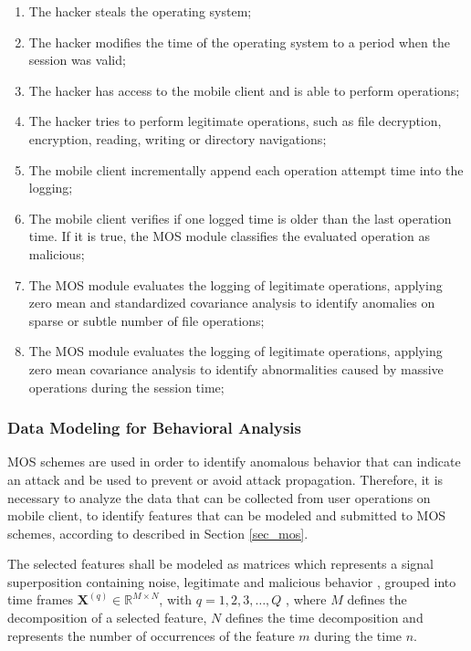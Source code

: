 \documentclass[twocolumn]{svjour3}          	%
\begin{document}
\begin{enumerate}[label=(\alph*)]
	\item The hacker steals the operating system;
	\item The hacker modifies the time of the operating system to a period when the session was valid;
	\item The hacker has access to the mobile client and is able to perform operations;
	\item The hacker tries to perform legitimate operations, such as file decryption, encryption, reading, writing or directory navigations;
	\item The mobile client incrementally append each operation attempt time into the logging;
	\item The mobile client verifies if one logged time is older than the last operation time. If it is true, the MOS module classifies the evaluated operation as malicious;
	\item The MOS module evaluates the logging of legitimate operations, applying zero mean and standardized covariance analysis to identify anomalies on sparse or subtle number of file operations;
	\item The MOS module evaluates the logging of legitimate operations, applying zero mean covariance analysis to identify abnormalities caused by massive operations during the session time;
\end{enumerate}

\subsubsection{Data Modeling for Behavioral Analysis }
\label{sec_data}

MOS schemes are used in order to identify anomalous behavior that can indicate an attack and be used to prevent or avoid attack propagation. Therefore, it is necessary to analyze the data that can be collected from user operations on mobile client, to identify features that can be modeled and submitted to MOS schemes, according to described in Section \ref{sec_mos}.

The selected features shall be modeled as matrices which represents a signal superposition containing noise, legitimate and malicious behavior \cite{tenorio2013greatest}, grouped into time frames $\mathbf{X}^{(q)} \in \mathbb{R}^{M\times{N}}$, with $q = 1, 2, 3, \ldots, Q$ , where $M$ defines the decomposition of a selected feature, $N$ defines the time decomposition and represents the number of occurrences of the feature $m$ during the time $n$.
\end{document}
